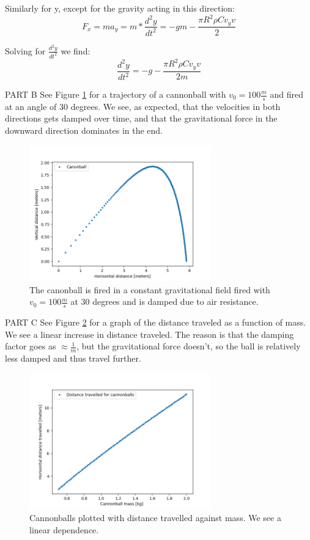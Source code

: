 \documentclass[11pt]{article}
\begin{document}
Similarly for y, except for the gravity acting in this direction:
\begin{equation}
    F_x=ma_y=m*\frac{d^2y}{dt^2}=-gm-\frac{\pi R^2 \rho C v_yv}{2}
\end{equation}

Solving for $\frac{d^2y}{dt^2}$ we find: 
\begin{equation}
    \frac{d^2y}{dt^2}=-g-\frac{\pi R^2 \rho C v_yv}{2m}
\end{equation}

PART B
See Figure \ref{cannon} for a trajectory of a cannonball with $v_0=100 \frac{m}{s}$ and fired at an angle of 30 degrees. We see, as expected, that the velocities in both directions gets damped over time, and that the gravitational force in the downward direction dominates in the end. 
\begin{figure}[!htbp]
    \centering
    \includegraphics[width=0.7\textwidth]{cannon.png}
    \caption{The canonball is fired in a constant gravitational field fired with $v_0=100 \frac{m}{s}$ at 30 degrees and is damped due to air resistance.}
    \label{cannon}
\end{figure}

PART C
See Figure \ref{mass} for a graph of the distance traveled as a function of mass. We see a linear increase in distance traveled. The reason is that the damping factor goes as $\approx\frac{1}{m}$, but the gravitational force doesn't, so the ball is relatively less damped and thus travel further. 

\begin{figure}[!htbp]
    \centering
    \includegraphics[width=0.7\textwidth]{mass.png}
    \caption{Cannonballs plotted with distance travelled against mass. We see a linear dependence. }
    \label{mass}
\end{figure}
\end{document}
